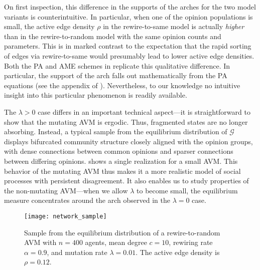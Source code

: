 \documentclass[review, onefignum, onetabnum]{siamart171218}
\begin{document}
	On first inspection, this difference in the supports of the arches for the two model variants is counterintuitive. 
	In particular, when one of the opinion populations is small, the active edge density $\rho$ in the rewire-to-same model is actually \emph{higher} than in the rewire-to-random model with the same opinion counts and parameters.  
	This is in marked contrast to the expectation that the rapid sorting of edges via rewire-to-same would presumably lead to lower active edge densities. 
	Both the PA and AME schemes in \cite{Durrett2012} replicate this qualitative difference. In particular, the support of the arch falls out mathematically from the PA equations (see the appendix of \cite{Durrett2012}). Nevertheless, to our knowledge no intuitive insight into this particular phenomenon is readily available. 

	The $\lambda > 0$ case differs in an important technical aspect---it is straightforward to show that the mutating AVM is ergodic. 
	Thus, fragmented states are no longer absorbing. 
	Instead, a typical sample from the equilibrium distribution of $\mathcal{G}$ displays bifurcated community structure closely aligned with the opinion groups, with dense connections between common opinions and sparser connections between differing opinions. 
	 shows a single realization for a small AVM. 
	This behavior of the mutating AVM thus makes it a more realistic model of social processes with persistent disagreement. 
	It also enables us to study properties of the non-mutating AVM---when we allow $\lambda$ to become small, the equilibrium measure concentrates around the arch observed in the $\lambda = 0$ case. 
	\begin{figure}
		\centering
		\texttt{[image: network\_sample]}
		\caption{Sample from the equilibrium distribution of a rewire-to-random AVM with $n = 400$ agents, mean degree $c = 10$, rewiring rate $\alpha = 0.9$, and mutation rate $\lambda = 0.01$. The active edge density is $\rho = 0.12$.} \label{fig:sample}
	\end{figure}
	
\end{document}
